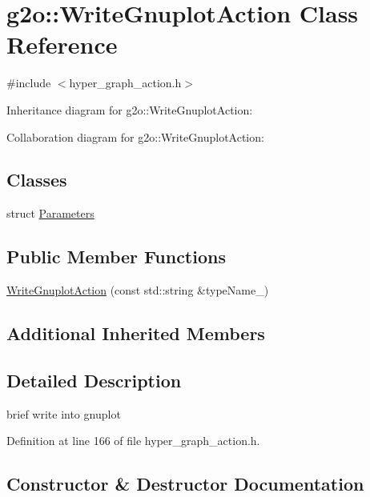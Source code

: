 \hypertarget{classg2o_1_1WriteGnuplotAction}{}\section{g2o\+:\+:Write\+Gnuplot\+Action Class Reference}
\label{classg2o_1_1WriteGnuplotAction}


{\ttfamily \#include $<$hyper\+\_\+graph\+\_\+action.\+h$>$}



Inheritance diagram for g2o\+:\+:Write\+Gnuplot\+Action\+:


Collaboration diagram for g2o\+:\+:Write\+Gnuplot\+Action\+:
\subsection*{Classes}
\begin{DoxyCompactItemize}
\item 
struct \hyperlink{structg2o_1_1WriteGnuplotAction_1_1Parameters}{Parameters}
\end{DoxyCompactItemize}
\subsection*{Public Member Functions}
\begin{DoxyCompactItemize}
\item 
\hyperlink{classg2o_1_1WriteGnuplotAction_abfae045b16ae760f6d0c7feefe4b751f}{Write\+Gnuplot\+Action} (const std\+::string \&type\+Name\+\_\+)
\end{DoxyCompactItemize}
\subsection*{Additional Inherited Members}


\subsection{Detailed Description}
brief write into gnuplot 

Definition at line 166 of file hyper\+\_\+graph\+\_\+action.\+h.



\subsection{Constructor \& Destructor Documentation}
